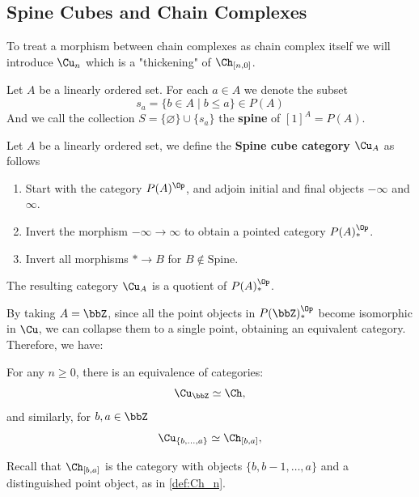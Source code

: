 \subsection{Spine Cubes and Chain Complexes}
To treat a morphism between chain complexes as chain complex itself we will introduce $\Cu_n$ which is a "thickening" of $\Ch_{[n,0]}$.

\begin{defn}
Let $A$ be a linearly ordered set. For each $a \in A$ we denote the subset
\begin{equation*}
    s_a = \{b \in A\mid b\leq a\} \in P(A)
\end{equation*}
And we call the collection $S = \{\varnothing\}\cup \{s_a\}$ the \textbf{spine} of $[1]^A=P(A)$.
\end{defn}

\begin{defn}
Let $A$ be a linearly ordered set, we define the \textbf{Spine cube category} $\Cu_A$ as follows
\begin{enumerate}
    \item Start with the category $P(A)^{\Op}$, and adjoin initial and final objects $-\infty$ and $\infty$.
    \item Invert the morphism $-\infty \to \infty$ to obtain a pointed category $P(A)_*^{\Op}$.
    \item Invert all morphisms $* \to B$ for $B \notin \text{Spine}$.
\end{enumerate}
The resulting category $\Cu_A$ is a quotient of $P(A)_*^{\Op}$.
\end{defn}

By taking $A = \bbZ$, since all the point objects in $P(\bbZ)_*^{\Op}$ become isomorphic in $\Cu$, we can collapse them to a single point, obtaining an equivalent category. Therefore, we have:

\begin{cor}\label{cor:cub_thin_model}
    For any $n \geq 0$, there is an equivalence of categories:
    \begin{equation*}
        \Cu_{\bbZ} \simeq \Ch,
    \end{equation*}
    and similarly, for $b,a \in \bbZ$
    \begin{equation*}
        \Cu_{\{b,\dots, a\}} \simeq \Ch_{[b,a]},
    \end{equation*}
\end{cor}

Recall that $\Ch_{[b,a]}$ is the category with objects $\{ b, b-1, \dots, a \}$ and a distinguished point object, as in \cref{def:Ch_n}.

